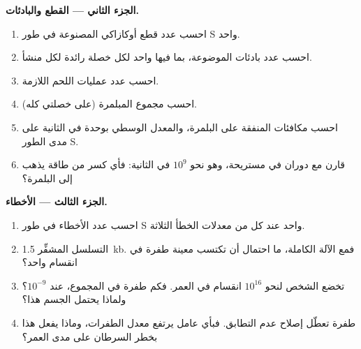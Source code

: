 \begin{problem}
\medskip
\noindent\textbf{الجزء الثاني --- القطع والبادئات.}
\begin{enumerate}[resume]
  \item احسب عدد قطع أوكازاكي المصنوعة في طور S واحد.
  \item احسب عدد بادئات  الموضوعة، بما فيها واحد لكل خصلة رائدة
        لكل منشأ.
  \item احسب عدد عمليات اللحم اللازمة.
  \item احسب مجموع  المبلمرة (على خصلتي  كله).
  \item احسب مكافئات  المنفقة على البلمرة، والمعدل الوسطي بوحدة
         في الثانية على مدى الطور S.
  \item قارن مع دوران  في  مستريحة، وهو نحو $10^9$ في الثانية:
        فأي كسر من طاقة  يذهب إلى البلمرة؟
\end{enumerate}

\medskip
\noindent\textbf{الجزء الثالث --- الأخطاء.}
\begin{enumerate}[resume]
  \item احسب عدد الأخطاء في طور S واحد عند كل من معدلات الخطأ
        الثلاثة.
  \item التسلسل المشفِّر  \qty{1.5}{kb}. فمع الآلة الكاملة، ما
        احتمال أن تكتسب  معينة طفرة في انقسام واحد؟
  \item تخضع  الشخص لنحو $10^{16}$ انقسام في العمر. فكم طفرة في
        المجموع، عند $10^{-9}$؟ ولماذا يحتمل الجسم هذا؟
  \item طفرة تعطّل إصلاح عدم التطابق. فبأي عامل يرتفع معدل الطفرات،
        وماذا يفعل هذا بخطر السرطان على مدى العمر؟
\end{enumerate}


\end{problem}
